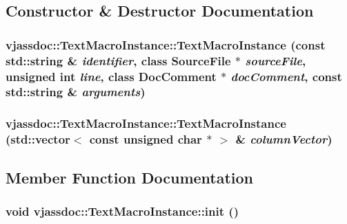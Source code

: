 \subsection{Constructor \& Destructor Documentation}
\hypertarget{classvjassdoc_1_1TextMacroInstance_e6f4e775e305ef77a1952b6ff909193d}{
\subsubsection{\setlength{\rightskip}{0pt plus 5cm}vjassdoc::TextMacroInstance::TextMacroInstance (const std::string \& {\em identifier}, class {\bf SourceFile} $\ast$ {\em sourceFile}, unsigned int {\em line}, class {\bf DocComment} $\ast$ {\em docComment}, const std::string \& {\em arguments})}}
\label{classvjassdoc_1_1TextMacroInstance_e6f4e775e305ef77a1952b6ff909193d}


\hypertarget{classvjassdoc_1_1TextMacroInstance_7bd68ef5afcd884b1802e5b4dbaf829d}{
\subsubsection{\setlength{\rightskip}{0pt plus 5cm}vjassdoc::TextMacroInstance::TextMacroInstance (std::vector$<$ const unsigned char $\ast$ $>$ \& {\em columnVector})}}
\label{classvjassdoc_1_1TextMacroInstance_7bd68ef5afcd884b1802e5b4dbaf829d}




\subsection{Member Function Documentation}
\hypertarget{classvjassdoc_1_1TextMacroInstance_e60b03ce172f8eefde2cdcc31533ee2d}{
\subsubsection{\setlength{\rightskip}{0pt plus 5cm}void vjassdoc::TextMacroInstance::init ()}}
\label{classvjassdoc_1_1TextMacroInstance_e60b03ce172f8eefde2cdcc31533ee2d}




